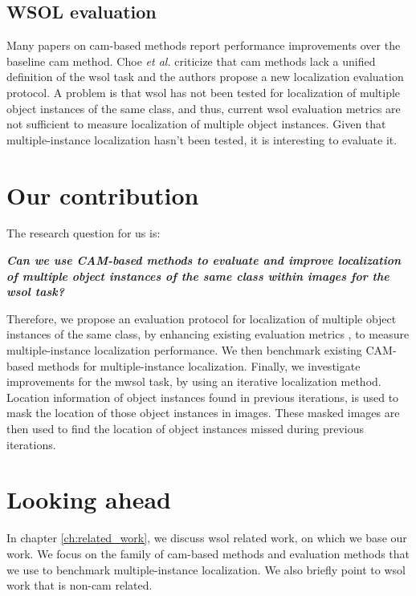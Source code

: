 \subsection{WSOL evaluation}
Many papers on \acrshort{cam}-based methods report performance improvements over the baseline \acrshort{cam} method. Choe \textit{et al.} \cite{choe2020evaluating} criticize that \acrshort{cam} methods lack a unified definition of the \acrshort{wsol} task and the authors propose a new localization evaluation protocol. A problem is that \acrshort{wsol} has not been tested for localization of multiple object instances of the same class, and thus, current \acrshort{wsol} evaluation metrics are not sufficient to measure localization of multiple object instances. Given that multiple-instance localization hasn't been tested, it is interesting to evaluate it. 

\section{Our contribution}
The research question for us is:

\begin{center}
\textbf{\textit{Can we use CAM-based methods to evaluate and improve localization of multiple object instances of the same class within images for the \acrshort{wsol} task?}}
\end{center}

Therefore, we propose an evaluation protocol for localization of multiple object instances of the same class, by enhancing existing evaluation metrics \cite{choe2020evaluating}, to measure multiple-instance localization performance.  We then benchmark existing CAM-based methods for multiple-instance localization. Finally, we investigate improvements for the \acrshort{mwsol} task, by using an iterative localization method. Location information of object instances found in previous iterations, is used to mask the location of those object instances in images. These masked images are then used to find the location of object instances missed during previous iterations.

\section{Looking ahead}
In chapter \ref{ch:related_work}, we discuss \acrshort{wsol} related work, on which we base our work. We focus on the family of \acrshort{cam}-based methods and evaluation methods that we use to benchmark multiple-instance localization. We also briefly point to \acrshort{wsol} work that is non-\acrshort{cam} related. 

